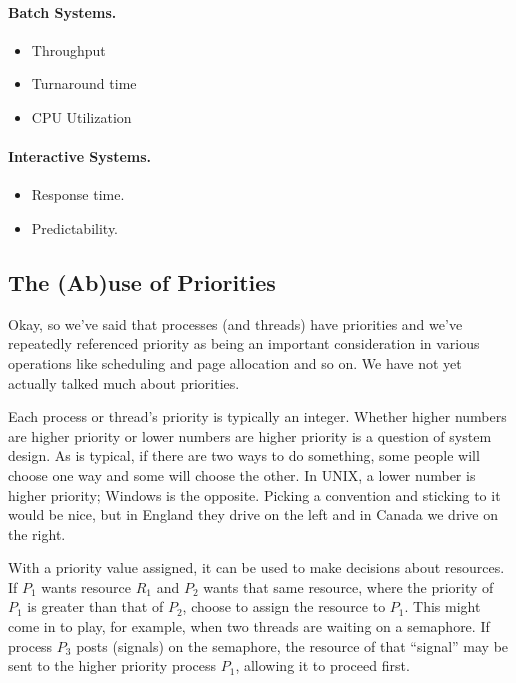 \paragraph{Batch Systems.}
\begin{itemize}
	\item Throughput
	\item Turnaround time
	\item CPU Utilization
\end{itemize}

\paragraph{Interactive Systems.}
\begin{itemize}
	\item Response time.
	\item Predictability.
\end{itemize}

\subsection*{The (Ab)use of Priorities}

Okay, so we've said that processes (and threads) have priorities and we've repeatedly referenced priority as being an important consideration in various operations like scheduling and page allocation and so on. We have not yet actually talked much about priorities.

Each process or thread's priority is typically an integer. Whether higher numbers are higher priority or lower numbers are higher priority is a question of system design. As is typical, if there are two ways to do something, some people will choose one way and some will choose the other. In UNIX, a lower number is higher priority; Windows is the opposite. Picking a convention and sticking to it would be nice, but in England they drive on the left and in Canada we drive on the right.

With a priority value assigned, it can be used to make decisions about resources. If $P_{1}$ wants resource $R_{1}$ and $P_{2}$ wants that same resource, where the priority of $P_{1}$ is greater than that of $P_{2}$, choose to assign the resource to $P_{1}$. This might come in to play, for example, when two threads are waiting on a semaphore. If process $P_{3}$ posts (signals) on the semaphore, the resource of that ``signal'' may be sent to the higher priority process $P_{1}$, allowing it to proceed first.

